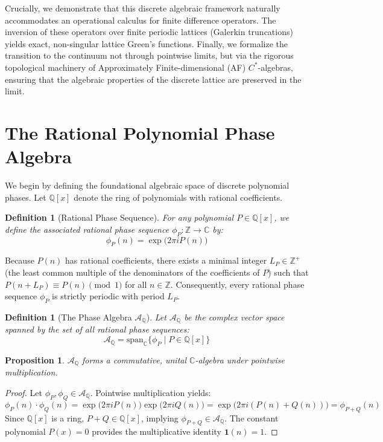 \documentclass[11pt,a4paper]{article}
\newtheorem{definition}[theorem]{Definition}
\newtheorem{proposition}[theorem]{Proposition}
\begin{document}
Crucially, we demonstrate that this discrete algebraic framework naturally accommodates an operational calculus for finite difference operators. The inversion of these operators over finite periodic lattices (Galerkin truncations) yields exact, non-singular lattice Green's functions. Finally, we formalize the transition to the continuum not through pointwise limits, but via the rigorous topological machinery of Approximately Finite-dimensional (AF) $C^*$-algebras, ensuring that the algebraic properties of the discrete lattice are preserved in the limit.

\section{The Rational Polynomial Phase Algebra}

We begin by defining the foundational algebraic space of discrete polynomial phases. Let $\mathbb{Q}[x]$ denote the ring of polynomials with rational coefficients. 

\begin{definition}[Rational Phase Sequence]
For any polynomial $P \in \mathbb{Q}[x]$, we define the associated rational phase sequence $\phi_P : \mathbb{Z} \to \mathbb{C}$ by:
\begin{equation}
\phi_P(n) = \exp\big(2\pi i P(n)\big)
\end{equation}
\end{definition}

Because $P(n)$ has rational coefficients, there exists a minimal integer $L_P \in \mathbb{Z}^+$ (the least common multiple of the denominators of the coefficients of $P$) such that $P(n + L_P) \equiv P(n) \pmod 1$ for all $n \in \mathbb{Z}$. Consequently, every rational phase sequence $\phi_P$ is strictly periodic with period $L_P$.

\begin{definition}[The Phase Algebra $\mathcal{A}_{\mathbb{Q}}$]
Let $\mathcal{A}_{\mathbb{Q}}$ be the complex vector space spanned by the set of all rational phase sequences:
\begin{equation}
\mathcal{A}_{\mathbb{Q}} = \text{span}_{\mathbb{C}} \big\{ \phi_P \;\big|\; P \in \mathbb{Q}[x] \big\}
\end{equation}
\end{definition}

\begin{proposition}
$\mathcal{A}_{\mathbb{Q}}$ forms a commutative, unital $\mathbb{C}$-algebra under pointwise multiplication.
\end{proposition}
\begin{proof}
Let $\phi_P, \phi_Q \in \mathcal{A}_{\mathbb{Q}}$. Pointwise multiplication yields:
\begin{equation}
\phi_P(n) \cdot \phi_Q(n) = \exp\big(2\pi i P(n)\big) \exp\big(2\pi i Q(n)\big) = \exp\big(2\pi i (P(n) + Q(n))\big) = \phi_{P+Q}(n)
\end{equation}
Since $\mathbb{Q}[x]$ is a ring, $P+Q \in \mathbb{Q}[x]$, implying $\phi_{P+Q} \in \mathcal{A}_{\mathbb{Q}}$. The constant polynomial $P(x) = 0$ provides the multiplicative identity $\mathbf{1}(n) = 1$.
\end{proof}
\end{document}
